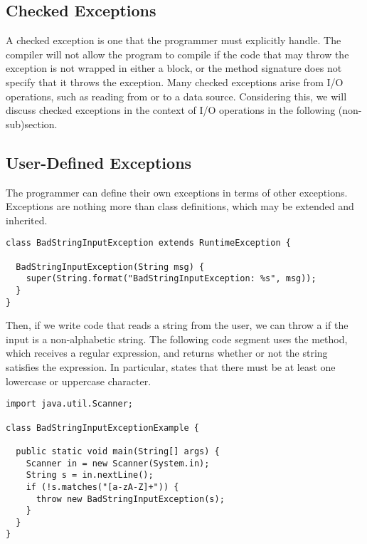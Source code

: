 \subsection{Checked Exceptions}

A checked exception is one that the programmer must explicitly handle. The compiler will not allow the program to compile if the code that may throw the exception is not wrapped in either a  block, or the method signature does not specify that it throws the exception. Many checked exceptions arise from I/O operations, such as reading from or to a data source. Considering this, we will discuss checked exceptions in the context of I/O operations in the following (non-sub)section.

\subsection{User-Defined Exceptions}
The programmer can define their own exceptions in terms of other exceptions. Exceptions are nothing more than class definitions, which may be extended and inherited. 


\begin{lstlisting}[language=MyJava]
class BadStringInputException extends RuntimeException {
  
  BadStringInputException(String msg) {
    super(String.format("BadStringInputException: %s", msg));
  }
}
\end{lstlisting}

Then, if we write code that reads a string from the user, we can throw a  if the input is a non-alphabetic string. The following code segment uses the  method, which receives a regular expression, and returns whether or not the string satisfies the expression. In particular, \ttt{[a-zA-Z]+} states that there must be at least one lowercase or uppercase character.

\begin{lstlisting}[language=MyJava]
import java.util.Scanner;

class BadStringInputExceptionExample {
  
  public static void main(String[] args) {
    Scanner in = new Scanner(System.in);
    String s = in.nextLine();
    if (!s.matches("[a-zA-Z]+")) { 
      throw new BadStringInputException(s); 
    }
  }
}
\end{lstlisting}
